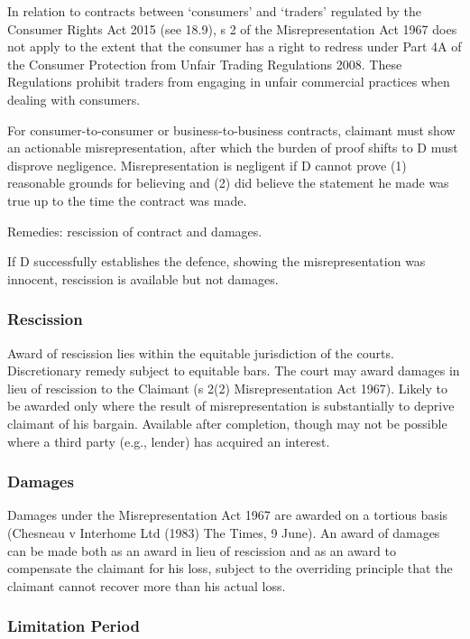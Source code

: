 \documentclass[
]{article}
\begin{document}
In relation to contracts between `consumers' and `traders' regulated by
the Consumer Rights Act 2015 (see 18.9), s 2 of the Misrepresentation
Act 1967 does not apply to the extent that the consumer has a right to
redress under Part 4A of the Consumer Protection from Unfair Trading
Regulations 2008. These Regulations prohibit traders from engaging in
unfair commercial practices when dealing with consumers.

For consumer-to-consumer or business-to-business contracts, claimant
must show an actionable misrepresentation, after which the burden of
proof shifts to D must disprove negligence. Misrepresentation is
negligent if D cannot prove (1) reasonable grounds for believing and (2)
did believe the statement he made was true up to the time the contract
was made.

Remedies: rescission of contract and damages.

If D successfully establishes the defence, showing the misrepresentation
was innocent, rescission is available but not damages.

\hypertarget{rescission-1}{%
\subsubsection{Rescission}\label{rescission-1}}

Award of rescission lies within the equitable jurisdiction of the
courts. Discretionary remedy subject to equitable bars. The court may
award damages in lieu of rescission to the Claimant (s 2(2)
Misrepresentation Act 1967). Likely to be awarded only where the result
of misrepresentation is substantially to deprive claimant of his
bargain. Available after completion, though may not be possible where a
third party (e.g., lender) has acquired an interest.

\hypertarget{damages-1}{%
\subsubsection{Damages}\label{damages-1}}

Damages under the Misrepresentation Act 1967 are awarded on a tortious
basis (Chesneau v Interhome Ltd (1983) The Times, 9 June). An award of
damages can be made both as an award in lieu of rescission and as an
award to compensate the claimant for his loss, subject to the overriding
principle that the claimant cannot recover more than his actual loss.

\hypertarget{limitation-period}{%
\subsubsection{Limitation Period}\label{limitation-period}}
\end{document}
